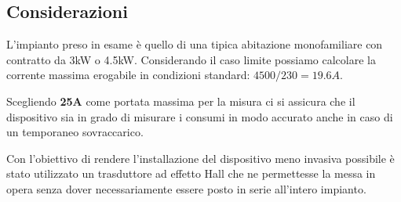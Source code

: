 \subsection{Considerazioni}
L'impianto preso in esame è quello di una tipica abitazione monofamiliare con
contratto da 3kW o 4.5kW. Considerando il caso limite possiamo calcolare la
corrente massima erogabile in condizioni standard: $4500/230 = 19.6A$.

Scegliendo \textbf{25A} come portata massima per la misura ci si assicura che il
dispositivo sia in grado di misurare i consumi in modo accurato anche in caso di
un temporaneo sovraccarico.

Con l'obiettivo di rendere l'installazione del dispositivo meno invasiva
possibile è stato utilizzato un trasduttore ad effetto Hall che ne permettesse
la messa in opera senza dover necessariamente essere posto in serie all'intero
impianto.
